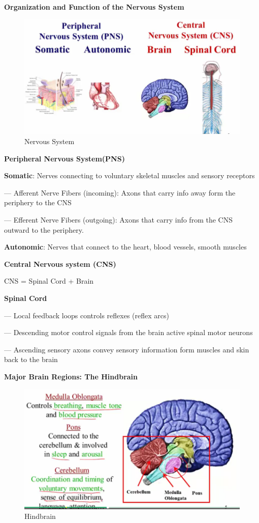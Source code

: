 \documentclass{book}
\begin{document}
\textbf{Organization and Function of the Nervous System}
\begin{figure}[h]
\centering
\includegraphics[width=0.7\linewidth]{./figures/nervoussystem}
\caption{Nervous System}

\label{fig:nervoussystem}
\end{figure}

 \textbf{Peripheral Nervous System(PNS)}
 
 \textbf{Somatic}: Nerves connecting to voluntary skeletal muscles and sensory receptors
 
 --- Afferent Nerve Fibers (incoming): Axons that carry info away form the periphery to the CNS
 
 --- Efferent Nerve Fibers (outgoing): Axons that carry info from the CNS outward to the periphery.
 
 \textbf{Autonomic}: Nerves that connect to the heart, blood vessels, smooth muscles
 
 \textbf{Central Nervous system (CNS)}
 
 CNS = Spinal Cord + Brain
 
 \textbf{Spinal Cord}
 
 --- Local feedback loops controls reflexes (reflex arcs)
 
 --- Descending motor control signals from the brain active spinal motor neurons
 
 --- Ascending sensory axons convey sensory information form muscles and skin back to the brain
 
 \textbf{Major Brain Regions: The Hindbrain}
 
 \begin{figure}
\centering
\includegraphics[width=0.7\linewidth]{./figures/hindbrain}
\caption{Hindbrain}
\label{fig:hindbrain}
\end{figure}
\end{document}

